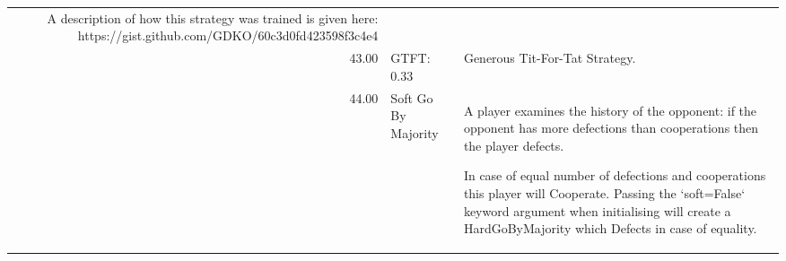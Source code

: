\begin{table}[!hbtp]
\begin{adjustbox}{width=2\textwidth, angle=90}
\begin{tabular}{rll}
	A description of how this strategy was trained is given here:
	https://gist.github.com/GDKO/60c3d0fd423598f3c4e4                                                                                                                                                                                                                                                                                                                                                                                                                                                                                                                                                                                                                                                                                                                                                        \\
	43.00  & GTFT: 0.33                  & Generous Tit-For-Tat Strategy.                                                                                                    \\
	44.00  & Soft Go By Majority         & A player examines the history of the opponent: if the opponent has more
	defections than cooperations then the player defects.

	In case of equal
	number of defections and cooperations this player will Cooperate. Passing
	the `soft=False` keyword argument when initialising will create a
	HardGoByMajority which Defects in case of equality.


\end{tabular}
\end{adjustbox}
\end{table}
